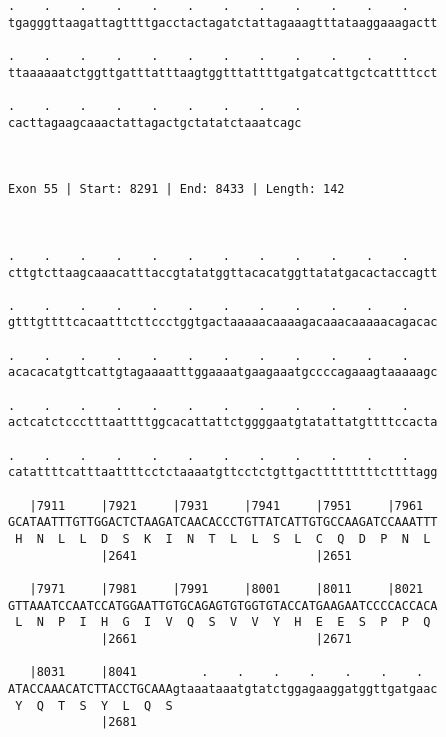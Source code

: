 \documentclass{article}
\begin{document}
\begin{Verbatim}
.    .    .    .    .    .    .    .    .    .    .    .    
tgagggttaagattagttttgacctactagatctattagaaagtttataaggaaagactt
                                                            
.    .    .    .    .    .    .    .    .    .    .    .    
ttaaaaaatctggttgatttatttaagtggtttattttgatgatcattgctcattttcct
                                                            
.    .    .    .    .    .    .    .    .
cacttagaagcaaactattagactgctatatctaaatcagc
                                         
                                         
 
Exon 55 | Start: 8291 | End: 8433 | Length: 142



.    .    .    .    .    .    .    .    .    .    .    .    
cttgtcttaagcaaacatttaccgtatatggttacacatggttatatgacactaccagtt
                                                            
.    .    .    .    .    .    .    .    .    .    .    .    
gtttgttttcacaatttcttccctggtgactaaaaacaaaagacaaacaaaaacagacac
                                                            
.    .    .    .    .    .    .    .    .    .    .    .    
acacacatgttcattgtagaaaatttggaaaatgaagaaatgccccagaaagtaaaaagc
                                                            
.    .    .    .    .    .    .    .    .    .    .    .    
actcatctccctttaattttggcacattattctggggaatgtatattatgttttccacta
                                                            
.    .    .    .    .    .    .    .    .    .    .    .    
catattttcatttaattttcctctaaaatgttcctctgttgactttttttttcttttagg
                                                            
   |7911     |7921     |7931     |7941     |7951     |7961  
GCATAATTTGTTGGACTCTAAGATCAACACCCTGTTATCATTGTGCCAAGATCCAAATTT
 H  N  L  L  D  S  K  I  N  T  L  L  S  L  C  Q  D  P  N  L 
             |2641                         |2651            
  
   |7971     |7981     |7991     |8001     |8011     |8021  
GTTAAATCCAATCCATGGAATTGTGCAGAGTGTGGTGTACCATGAAGAATCCCCACCACA
 L  N  P  I  H  G  I  V  Q  S  V  V  Y  H  E  E  S  P  P  Q 
             |2661                         |2671            
  
   |8031     |8041         .    .    .    .    .    .    .  
ATACCAAACATCTTACCTGCAAAgtaaataaatgtatctggagaaggatggttgatgaac
 Y  Q  T  S  Y  L  Q  S                                     
             |2681                                          
  

\end{Verbatim}
\end{document}
